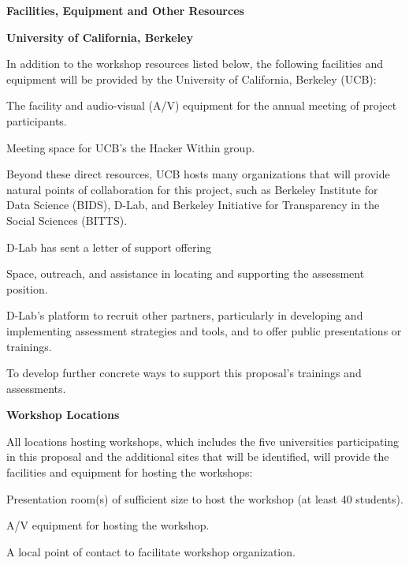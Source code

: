 \documentclass{proposalnsf}
\newlength{\up}
\begin{document}
\begin{center}
\large\textbf{Facilities, Equipment and Other Resources}
\end{center}

\textbf{University of California, Berkeley}

In addition to the workshop resources listed below, the following facilities and equipment will be provided by the University of California, Berkeley (UCB):
%
\begin{compactitem}
\item The facility and audio-visual (A/V) equipment for the annual meeting of project participants.
\item Meeting space for UCB's the Hacker Within group.
\end{compactitem}

Beyond these direct resources, UCB hosts many organizations that will provide natural points of collaboration for this project, such as Berkeley Institute for Data Science (BIDS), D-Lab, and Berkeley Initiative for Transparency in the Social Sciences (BITTS). 

D-Lab has sent a letter of support offering
%
\begin{compactitem}
\item Space, outreach, and assistance in locating and supporting the assessment position.
\item D-Lab's platform to recruit other partners, particularly in developing and implementing assessment strategies and tools, and to offer public presentations or trainings.
\item To develop further concrete ways to support this proposal's trainings and assessments. 
\end{compactitem}

\textbf{Workshop Locations}

All locations hosting workshops, which includes the five universities participating in this proposal and the additional sites that will be identified, will provide the facilities and equipment for hosting the workshops:
%
\begin{compactitem}
\item Presentation room(s) of sufficient size to host the workshop (at least 40 students).
\item A/V equipment for hosting the workshop.
\item A local point of contact to facilitate workshop organization.
\end{compactitem}
\end{document}
